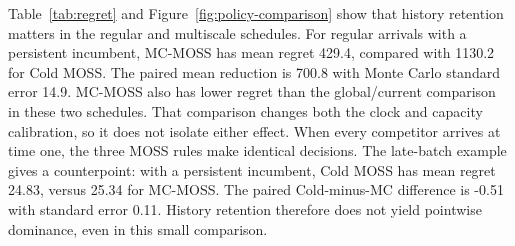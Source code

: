 Table~\ref{tab:regret} and Figure~\ref{fig:policy-comparison} show that history retention matters in the regular and multiscale schedules. For regular arrivals with a persistent incumbent, MC-MOSS has mean regret 429.4, compared with 1130.2 for Cold MOSS. The paired mean reduction is 700.8 with Monte Carlo standard error 14.9. MC-MOSS also has lower regret than the global/current comparison in these two schedules. That comparison changes both the clock and capacity calibration, so it does not isolate either effect. When every competitor arrives at time one, the three MOSS rules make identical decisions. The late-batch example gives a counterpoint: with a persistent incumbent, Cold MOSS has mean regret 24.83, versus 25.34 for MC-MOSS. The paired Cold-minus-MC difference is -0.51 with standard error 0.11. History retention therefore does not yield pointwise dominance, even in this small comparison.
